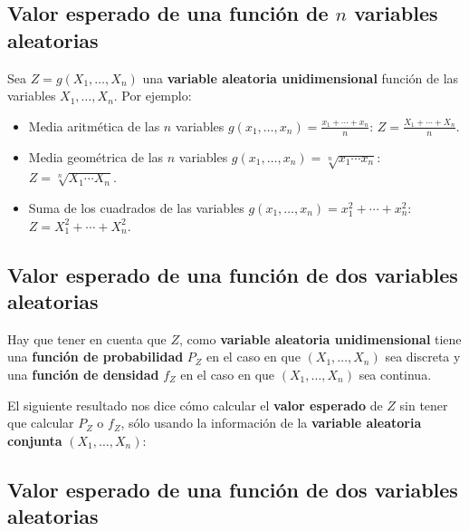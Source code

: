 \documentclass[]{book}
\providecommand{\tightlist}{%
  \setlength{\itemsep}{0pt}\setlength{\parskip}{0pt}}
\begin{document}
\hypertarget{valor-esperado-de-una-funciuxf3n-de-n-variables-aleatorias-1}{%
\subsection{\texorpdfstring{Valor esperado de una función de \(n\) variables aleatorias}{Valor esperado de una función de n variables aleatorias}}\label{valor-esperado-de-una-funciuxf3n-de-n-variables-aleatorias-1}}

Sea \(Z=g(X_1,\ldots,X_n)\) una \textbf{variable aleatoria unidimensional} función de las variables \(X_1,\ldots,X_n\). Por ejemplo:

\begin{itemize}
\tightlist
\item
  Media aritmética de las \(n\) variables \(g(x_1,\ldots,x_n)=\frac{x_1+\cdots + x_n}{n}\): \(Z=\frac{X_1+\cdots +X_n}{n}\).
\item
  Media geométrica de las \(n\) variables \(g(x_1,\ldots,x_n)=\sqrt[n]{x_1\cdots x_n}\): \(Z=\sqrt[n]{X_1\cdots X_n}\).
\item
  Suma de los cuadrados de las variables \(g(x_1,\ldots,x_n)=x_1^2+\cdots +x_n^2\): \(Z=X_1^2+\cdots +X_n^2\).
\end{itemize}

\hypertarget{valor-esperado-de-una-funciuxf3n-de-dos-variables-aleatorias-3}{%
\subsection{Valor esperado de una función de dos variables aleatorias}\label{valor-esperado-de-una-funciuxf3n-de-dos-variables-aleatorias-3}}

Hay que tener en cuenta que \(Z\), como \textbf{variable aleatoria unidimensional} tiene una \textbf{función de probabilidad} \(P_Z\) en el caso en que \((X_1,\ldots,X_n)\) sea discreta y una \textbf{función de densidad} \(f_Z\) en el caso en que \((X_1,\ldots,X_n)\) sea continua.

El siguiente resultado nos dice cómo calcular el \textbf{valor esperado} de \(Z\) sin tener que calcular \(P_Z\) o \(f_Z\), sólo usando la información de la \textbf{variable aleatoria conjunta} \((X_1,\ldots,X_n)\):

\hypertarget{valor-esperado-de-una-funciuxf3n-de-dos-variables-aleatorias-4}{%
\subsection{Valor esperado de una función de dos variables aleatorias}\label{valor-esperado-de-una-funciuxf3n-de-dos-variables-aleatorias-4}}
\end{document}
